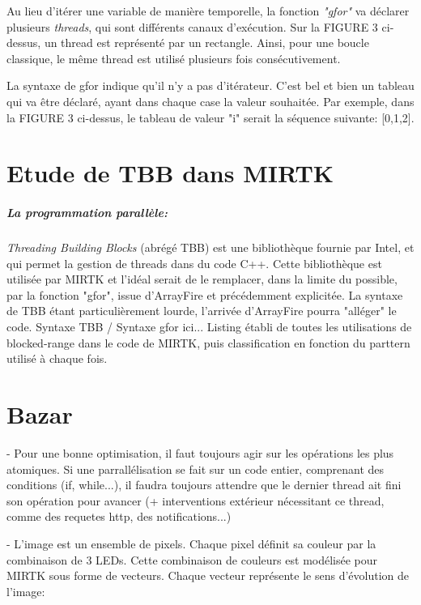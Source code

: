 \documentclass{report}
\begin{document}
Au lieu d'itérer une variable de manière temporelle, la fonction \textit{"gfor"} va déclarer plusieurs \textit{threads}, qui sont différents canaux d'exécution. Sur la FIGURE 3 ci-dessus, un thread est représenté par un rectangle. Ainsi, pour une boucle classique, le même thread est utilisé plusieurs fois consécutivement. 

La syntaxe de gfor indique qu'il n'y a pas d'itérateur. C'est bel et bien un tableau qui va être déclaré, ayant dans chaque case la valeur souhaitée. Par exemple, dans la FIGURE 3 ci-dessus, le tableau de valeur "i" serait la séquence suivante: [0,1,2].

\chapter*{Etude de TBB dans MIRTK}
\paragraph{La programmation parallèle:}
\textit{Threading Building Blocks} (abrégé TBB) est une bibliothèque fournie par Intel, et qui permet la gestion de threads dans du code C++. Cette bibliothèque est utilisée par MIRTK et l'idéal serait de le remplacer, dans la limite du possible, par la fonction "gfor", issue d'ArrayFire et précédemment explicitée.
La syntaxe de TBB étant particulièrement lourde, l'arrivée d'ArrayFire pourra "alléger" le code.
\newline\newline
Syntaxe TBB / Syntaxe gfor ici...
\newline\newline
Listing établi de toutes les utilisations de blocked-range dans le code de MIRTK, puis classification en fonction du parttern utilisé à chaque fois.

\chapter*{Bazar}
- Pour une bonne optimisation, il faut toujours agir sur les opérations les plus atomiques. Si une parrallélisation se fait sur un code entier, comprenant des conditions (if, while...), il faudra toujours attendre que le dernier thread ait fini son opération pour avancer (+ interventions extérieur nécessitant ce thread, comme des requetes http, des notifications...)

- L'image est un ensemble de pixels. Chaque pixel définit sa couleur par la combinaison de 3 LEDs. Cette combinaison de couleurs est modélisée pour MIRTK sous forme de vecteurs. Chaque vecteur représente le sens d'évolution de l'image: 
\end{document}
